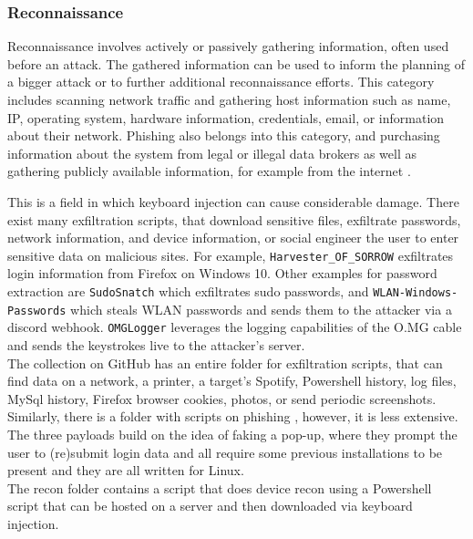\subsubsection{Reconnaissance}

Reconnaissance involves actively or passively gathering information, often used before an attack. The gathered information can be used to inform the planning of a bigger attack or to further additional reconnaissance efforts. This category includes scanning network traffic and gathering host information such as name, IP, operating system, hardware information, credentials, email, or information about their network. Phishing also belongs into this category, and purchasing information about the system from legal or illegal data brokers as well as gathering publicly available information, for example from the internet \cite{MITREATTCK}.

This is a field in which keyboard injection can cause considerable damage. There exist many exfiltration scripts, that download sensitive files, exfiltrate passwords, network information, and device information, or social engineer the user to enter sensitive data on malicious sites. 
For example, \verb|Harvester_OF_SORROW| \cite{OmgpayloadsPayloadsLibrary} exfiltrates login information from Firefox on Windows 10. Other examples for password extraction are \verb|SudoSnatch| \cite{OmgpayloadsPayloadsLibrary} which exfiltrates sudo passwords, and \verb|WLAN-Windows-Passwords| \cite{OmgpayloadsPayloadsLibrary}which steals WLAN passwords and sends them to the attacker via a discord webhook. 
\verb|OMGLogger| \cite{OmgpayloadsPayloadsLibrary} leverages the logging capabilities of the O.MG cable and sends the keystrokes live to the attacker's server. \\
The collection on GitHub has an entire folder for exfiltration scripts, that can find data on a network, a printer, a target's Spotify, Powershell history, log files, MySql history, Firefox browser cookies, photos, or send periodic screenshots. \\
Similarly, there is a folder with scripts on phishing  \cite{OmgpayloadsPayloadsLibrary}, however, it is less extensive. The three payloads build on the idea of faking a pop-up, where they prompt the user to (re)submit login data and all require some previous installations to be present and they are all written for Linux. \\
The recon folder contains a script that does device recon using a Powershell script that can be hosted on a server and then downloaded via keyboard injection. 


